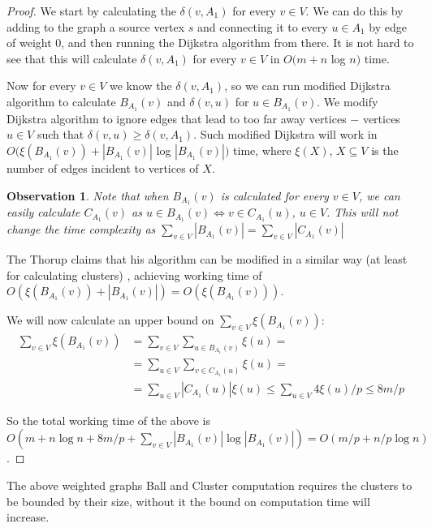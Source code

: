 \documentclass[shortabstract, lic, english]{iithesis}
\theoremstyle{definition} \newtheorem{definition}{Definition}[chapter]
\theoremstyle{plain} \newtheorem{remark}[definition]{Observation}
\theoremstyle{plain} \newtheorem{theorem}[definition]{Theorem}
\theoremstyle{plain} \newtheorem{lemma}[definition]{Lemma}
\theoremstyle{plain} \newtheorem{conjecture}[definition]{Conjecture}
\begin{document}
\begin{proof}
    We start by calculating the $\delta(v, A_1)$ for every $v \in V$. We can do this by adding to the graph a source vertex $s$ and connecting it to every $u \in A_1$ by edge of weight $0$, and then
    running the Dijkstra algorithm from there. It is not hard to see that this will calculate $\delta(v, A_1)$ for every $v \in V$ in $O(m + n $ log $n)$ time.
    
    Now for every $v \in V$ we know the $\delta(v, A_1)$, so
    we can run modified Dijkstra algorithm to calculate $B_{A_1}(v)$ and $\delta(v, u)$ for $u \in B_{A_1}(v)$.
    We modify Dijkstra algorithm to ignore edges that lead to too far away vertices $-$ vertices $u \in V$ such that $\delta(v,u) \geq \delta(v, A_1)$.
    Such modified Dijkstra will work in $O(\xi(B_{A_1}(v)) + |B_{A_1}(v)| $ log $|B_{A_1}(v)|)$ time, where $\xi(X)$, $X \subseteq V$
    is the number of edges incident to vertices of $X$.
    
    \begin{remark} \label{ballClusterEquivalence}
    Note that when $B_{A_1}(v)$ is calculated for every $v \in V$, we can easily calculate $C_{A_1}(v)$ as $u \in B_{A_1}(v) \iff v \in C_{A_1}(u)$, $u \in V$.
    This will not change the time complexity as $\sum_{v \in V}|B_{A_1}(v)| = \sum_{v \in V}|C_{A_1}(v)|$
    \end{remark}

    The Thorup claims that his algorithm can be modified in a similar way (at least for calculating clusters) \cite{a0OraclesBasic},
    achieving working time of $O(\xi(B_{A_1}(v)) + |B_{A_1}(v)|) = O(\xi(B_{A_1}(v)))$.

    We will now calculate an upper bound on $\sum_{v \in V} \xi(B_{A_1}(v))$:
    \begin{align}
    \sum_{v \in V} \xi(B_{A_1}(v)) &= \sum_{v \in V} \sum_{u \in B_{A_1}(v)} \xi(u) = \nonumber\\
    &= \sum_{u \in V} \sum_{v \in C_{A_1}(u)} \xi(u) = \nonumber\\
    &= \sum_{u \in V} |C_{A_1}(u)|\xi(u) \leq \sum_{u \in V} 4\xi(u)/p \leq 8m/p \nonumber
    \end{align}

    So the total working time of the above is \newline
    $O(m + n \log n + 8m/p + \sum_{v \in V}|B_{A_1}(v)| \log |B_{A_1}(v)|) = O(m/p + n/p \log n)$.
\end{proof}

The above weighted graphs Ball and Cluster computation requires the clusters to be bounded by their size, without it the bound on computation time will increase.
\end{document}
